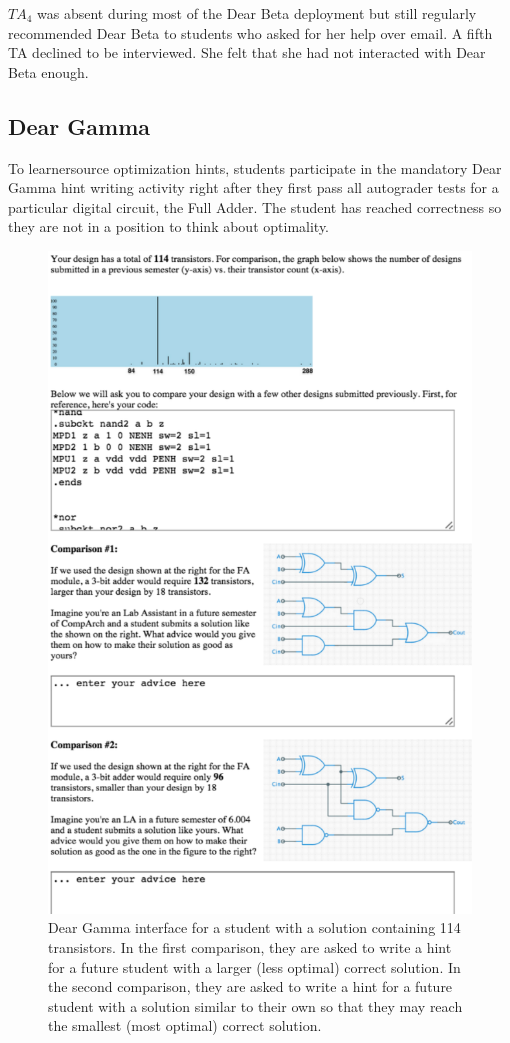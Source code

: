 $TA_{4}$ was absent during most of the Dear Beta deployment but still regularly recommended Dear Beta to students who asked for her help over email. A fifth TA declined to be interviewed. She felt that she had not interacted with Dear Beta enough.

\subsection{Dear Gamma}

To learnersource optimization hints, students participate in the mandatory Dear Gamma hint writing activity right after they first pass all autograder tests for a particular digital circuit, the Full Adder. The student has reached correctness so they are not in a position to think about optimality. %

\begin{figure}
\centering
\includegraphics[width=0.70\columnwidth]{Body/figures/classoverflow/deargamma_shortened.png}
\caption{Dear Gamma interface for a student with a solution containing 114 transistors. In the first comparison, they are asked to write a hint for a future student with a larger (less optimal) correct solution. In the second comparison, they are asked to write a hint for a future student with a solution similar to their own so that they may reach the smallest (most optimal) correct solution.}
\label{fig:deargamma}
\end{figure}

